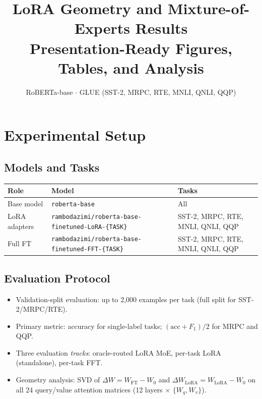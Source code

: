 \documentclass[11pt]{article}
\title{\textbf{LoRA Geometry and Mixture-of-Experts Results}\\
\large Presentation-Ready Figures, Tables, and Analysis}
\author{}
\date{RoBERTa-base $\cdot$ GLUE (SST-2, MRPC, RTE, MNLI, QNLI, QQP)}
\begin{document}
\maketitle
\tableofcontents
\vspace{1em}

\section{Experimental Setup}
\label{sec:setup}

\subsection*{Models and Tasks}

\begin{center}
\begin{tabular}{lll}
\toprule
\textbf{Role} & \textbf{Model} & \textbf{Tasks} \\
\midrule
Base model & \texttt{roberta-base} & All \\
LoRA adapters & \texttt{rambodazimi/roberta-base-finetuned-LoRA-\{TASK\}} & SST-2, MRPC, RTE, MNLI, QNLI, QQP \\
Full FT & \texttt{rambodazimi/roberta-base-finetuned-FFT-\{TASK\}} & SST-2, MRPC, RTE, MNLI, QNLI, QQP \\
\bottomrule
\end{tabular}
\end{center}

\subsection*{Evaluation Protocol}

\begin{itemize}
\item Validation-split evaluation: up to 2{,}000 examples per task (full split for SST-2/MRPC/RTE).
\item Primary metric: accuracy for single-label tasks; $(\text{acc}+F_1)/2$ for MRPC and QQP.
\item Three evaluation \emph{tracks}: oracle-routed LoRA MoE, per-task LoRA (standalone), per-task FFT.
\item Geometry analysis: SVD of $\Delta W = W_\mathrm{FT} - W_0$ and $\Delta W_\mathrm{LoRA} = W_\mathrm{LoRA} - W_0$ on all 24 query/value attention matrices (12 layers $\times$ $\{W_q, W_v\}$).
\end{itemize}
\end{document}
